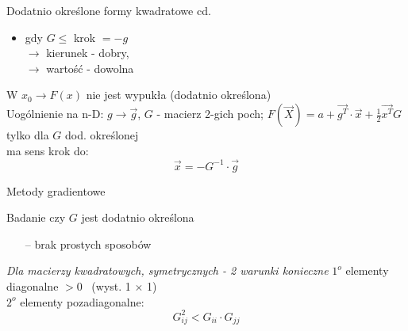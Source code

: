   \begin{frame}{Dodatnio określone formy kwadratowe cd.}

    \begin{block}{}
    	\begin{itemize}
	  	    \item gdy $G \leq$ krok $= -g$
	  	    \\$\rightarrow$ kierunek - dobry,
	  	    \\$\rightarrow$ wartość - dowolna
	    \end{itemize}
	    W $x_0 \rightarrow F(x)$ nie jest wypukła (dodatnio określona)
	    \medskip
	    \\Uogólnienie na n-D:
	    $g \rightarrow \vec{g}$, $G$ - macierz 2-gich poch;
	    $F(\vec X) = a + \vec{g^T} \cdot \vec{x} + \frac{1}{2} \vec{x^T} G$ tylko dla $G$ dod. określonej
	    \\ma sens krok do:
	    \begin{displaymath}
	  		\vec{x} = - G^{-1} \cdot \vec{g}
	    \end{displaymath}
    \end{block}

  \end{frame}

  \begin{frame}{Metody gradientowe}

    \begin{block}{Badanie czy $G$ jest dodatnio określona}
      \begin{itemize}
      		\item[--] brak prostych sposobów
      \end{itemize}
    \end{block}
    \begin{block}{\emph{Dla macierzy kwadratowych, symetrycznych - 2 warunki konieczne}}
      $1^o$ elementy diagonalne $> 0$ \ (wyst. 1 $\times$ 1)
      \\$2^o$ elementy pozadiagonalne:
      \begin{displaymath}
      		G_{ij}^2 < G_{ii} \cdot G_{jj}
      \end{displaymath}
    \end{block}

  \end{frame}

